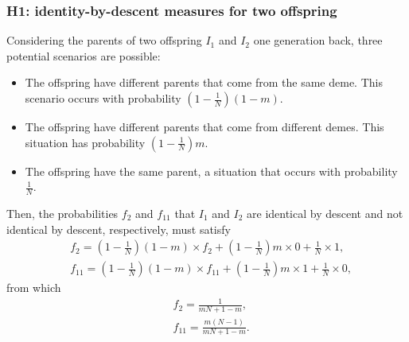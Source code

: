 \documentclass[11pt]{article}
\begin{document}
\subsubsection*{H1: identity-by-descent measures for two offspring}


Considering the parents of two offspring
$I_1$ and $I_2$ one generation back, three potential scenarios are possible:
\begin{itemize}
\item The offspring have different parents that come from the same deme. This scenario occurs with probability $\left(1-\frac{1}{N}\right)(1-m)$.
\item The offspring have different parents that come from different demes. This situation has probability $\left(1-\frac{1}{N}\right)m$.
\item The offspring have the same parent, a situation that occurs with probability $\frac{1}{N}$.
\end{itemize}

Then, the probabilities $f_{2}$ and $f_{11}$ that $I_1$ and $I_2$ are identical by descent and not identical by descent, respectively, must satisfy
\begin{subequations}
\begin{align}
&f_{2}=\left(1-\frac{1}{N}\right)(1-m)\times f_{2}+\left(1-\frac{1}{N}\right)m\times0+\frac{1}{N}\times1,\\
&f_{11}=\left(1-\frac{1}{N}\right)(1-m)\times f_{11}+\left(1-\frac{1}{N}\right)m\times1+\frac{1}{N}\times0,
\end{align}
\end{subequations}
from which 
\begin{subequations}
\begin{align}
&f_{2}=\frac{1}{mN+1-m},\\
&f_{11}=\frac{m(N-1)}{mN+1-m}.
\end{align}
\end{subequations}



\end{document}
